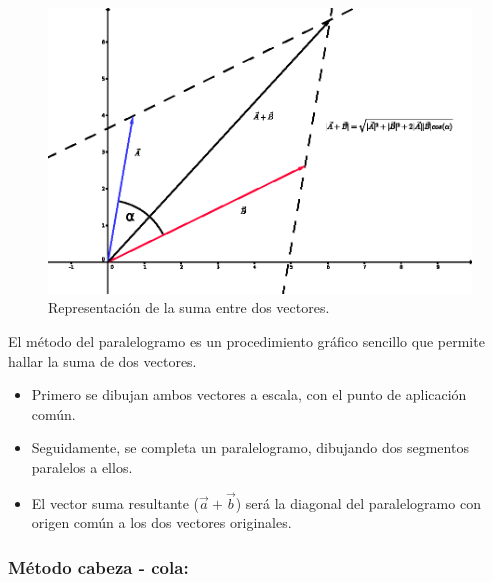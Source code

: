 \begin{figure}
\centering
 \includegraphics[scale=0.9]{images/vector_cinco.eps}
    \caption{\small{Representación de la suma entre dos vectores.}}
\end{figure}

El método del paralelogramo es un procedimiento gráfico sencillo que permite hallar la suma de dos vectores.

\begin{itemize}
 \item Primero se dibujan ambos vectores a escala, con el punto de aplicación común.
 \item Seguidamente, se completa un paralelogramo, dibujando dos segmentos paralelos a ellos.
 \item El vector suma resultante ($\vec{a} + \vec{b}$) será la diagonal del paralelogramo con origen común a los dos 
 vectores originales.
\end{itemize}

\subsubsection{Método cabeza - cola:}

